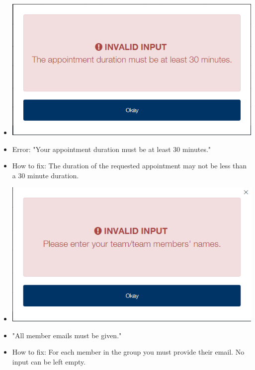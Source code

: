 \begin{itemize}
\begin{itemize}
				
				\item \includegraphics[width=\linewidth]{images/Screenshots/Errors/NotLoggedIn/30mins.png}
				\item Error: "Your appointment duration must be at least 30 minutes."
				\item How to fix: The duration of the requested appointment may not be less than a 30 minute duration.
				
				\item \includegraphics[width=\linewidth]{images/Screenshots/Errors/NotLoggedIn/Names.png}
				\item "All member emails must be given."
				\item How to fix: For each member in the group you must provide their email. No input can be left empty.
				

\end{itemize}
\end{itemize}
